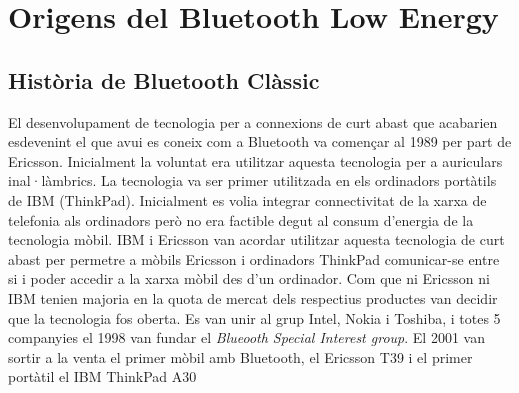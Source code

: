 \chapter{Origens del Bluetooth Low Energy}\label{C:compaginacio}



\section{Història de Bluetooth Clàssic}
El desenvolupament de tecnologia per a connexions de curt abast que acabarien esdevenint el que avui es coneix com a Bluetooth va començar al 1989 per part de Ericsson.
Inicialment la voluntat era utilitzar aquesta tecnologia per a auriculars inal·làmbrics. La tecnologia va ser primer utilitzada en els ordinadors portàtils de IBM (ThinkPad). Inicialment es volia integrar connectivitat de la xarxa de telefonia als ordinadors però no era factible degut al consum d'energia de la tecnologia mòbil.
IBM i Ericsson van acordar utilitzar aquesta tecnologia de curt abast per permetre a mòbils Ericsson i ordinadors ThinkPad comunicar-se entre si i poder accedir a la xarxa mòbil des d'un ordinador.
Com que ni Ericsson ni IBM tenien majoria en la quota de mercat dels respectius productes van decidir que la tecnologia fos oberta. Es van unir al grup Intel, Nokia i Toshiba, i totes 5 companyies el 1998 van fundar el \textit{Blueooth Special Interest group}.
El 2001 van sortir a la venta el primer mòbil amb Bluetooth, el Ericsson T39 i el primer portàtil el IBM ThinkPad A30


